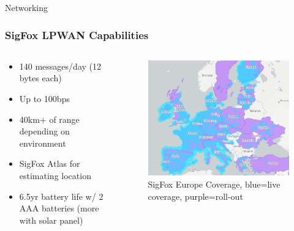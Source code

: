 \documentclass{beamer}
\begin{document}
  \begin{frame}{Networking}
    \frametitle{SigFox LPWAN Capabilities}
    \begin{columns}
      \begin{column}{0.5\textwidth}
        \begin{itemize}
          \item 140 messages/day (12 bytes each)
          \item Up to 100bps
          \item 40km+ of range depending on environment
          \item SigFox Atlas for estimating location
          \item 6.5yr battery life w/ 2 AAA batteries (more with solar panel)
        \end{itemize}
      \end{column}
      \begin{column}{0.5\textwidth}
        \begin{figure}[htbp]
          \centering
          \includegraphics[width=\textwidth]{images/SigFoxCoverage.png}
          \caption{SigFox Europe Coverage, blue=live coverage, purple=roll-out \cite{Sigfox_0G_Technology_2024}}
          \label{fig:SigFox_Coverage}
        \end{figure}
      \end{column}
    \end{columns}
  \end{frame}
\end{document}
